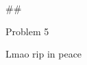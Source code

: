 \documentclass[11pt]{article}
\begin{document}
\begin{Verbatim}[commandchars=\\\{\}]
    \end{Verbatim}

    \#\#

Problem 5

    Lmao rip in peace


    
    
    
    
\end{document}
